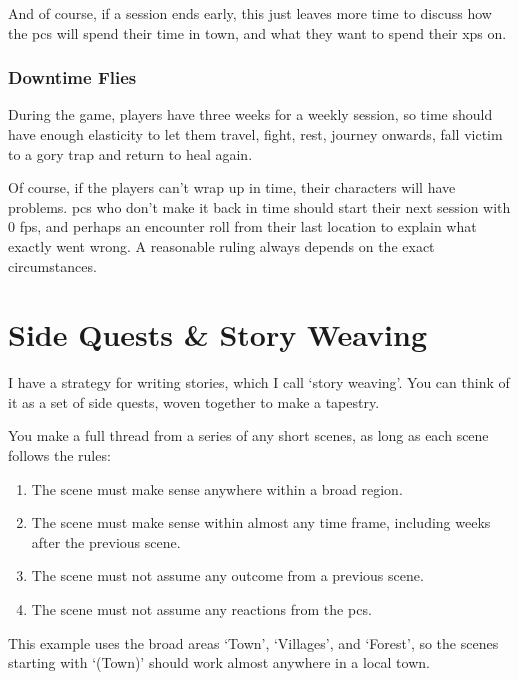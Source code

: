 \begin{multicols}{2}
And of course, if a session ends early, this just leaves more time to discuss how the \glspl{pc} will spend their time in town, and what they want to spend their \glspl{xp} on.

\subsubsection{Downtime Flies}

During the game, players have three weeks for a weekly session, so time should have enough elasticity to let them travel, fight, rest, journey onwards, fall victim to a gory trap and return to heal again.

Of course, if the players can't wrap up in time, their characters will have problems.
\Glspl{pc} who don't make it back in time should start their next session with 0 \glspl{fp}, and perhaps an encounter roll from their last location to explain what exactly went wrong.
A reasonable ruling always depends on the exact circumstances.

\end{multicols}

\section{Side Quests \& Story Weaving}

\label{sidequests}

\begin{multicols}{2}
\noindent
I have a strategy for writing stories, which I call `story weaving'.
You can think of it as a set of side quests, woven together to make a tapestry.

You make a full thread from a series of any short scenes, as long as each scene follows the rules:

\begin{enumerate}
  \item
  The scene must make sense anywhere within a broad region.
  \item
  The scene must make sense within almost any time frame, including weeks after the previous scene.
  \item
  The scene must not assume any outcome from a previous scene.
  \item
  The scene must not assume any reactions from the \glspl{pc}.
\end{enumerate}

This example uses the broad areas `Town', `Villages', and `Forest', so the scenes starting with `(Town)' should work almost anywhere in a local town.

\end{multicols}

